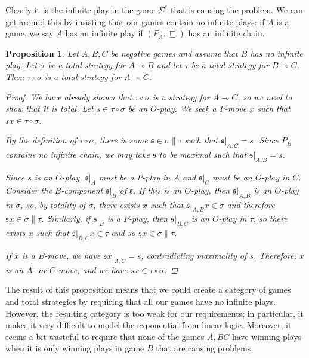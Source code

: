 \documentclass[11pt]{article} %
\theoremstyle{plain} %
\newtheorem{proposition}[theorem]{Proposition}
\theoremstyle{definition} %
\theoremstyle{note}
\theoremstyle{exercisestyle}
\renewcommand{\implies}{\multimap}
\newcommand{\comp}[2]{#1 \circ #2}
\newcommand{\s}{\mathfrak s}
\newcommand{\prefix}{\sqsubseteq}
\newcommand{\st}{{\Sigma^*}}
\begin{document}
Clearly it is the infinite play in the game $\st$ that is causing the problem.  We can get around this by insisting that our games contain no infinite plays: if $A$ is a game, we say $A$ has an infinite play if $(P_A,\prefix)$ has an infinite chain.

\begin{proposition}
  \label{BoundedTotalComposition}
  Let $A,B,C$ be negative games and assume that $B$ has no infinite play.  Let $\sigma$ be a total strategy for $A\implies B$ and let $\tau$ be a total strategy for $B\implies C$.  Then $\comp\tau\sigma$ is a total strategy for $A\implies C$.
  \begin{proof}
    We have already shown that $\comp\tau\sigma$ is a strategy for $A\implies C$, so we need to show that it is total.  Let $s\in\comp\tau\sigma$ be an $O$-play.  We seek a $P$-move $x$ such that $sx\in\comp\tau\sigma$.  

    By the definition of $\comp\tau\sigma$, there is some $\s\in\sigma\|\tau$ such that $\s\vert_{A,C}=s$.  Since $P_B$ contains no infinite chain, we may take $\s$ to be maximal such that $\s\vert_{A,B}=s$.  
    
    Since $s$ is an $O$-play, $\s\vert_A$ must be a $P$-play in $A$ and $\s\vert_C$ must be an $O$-play in $C$.  Consider the $B$-component $\s\vert_B$ of $\s$.  If this is an $O$-play, then $\s\vert_{A,B}$ is an $O$-play in $\sigma$, so, by totality of $\sigma$, there exists $x$ such that $\s\vert_{A,B}x\in\sigma$ and therefore $\s x\in\sigma\|\tau$.  Similarly, if $\s\vert_B$ is a $P$-play, then $\s\vert_{B,C}$ is an $O$-play in $\tau$, so there exists $x$ such that $\s\vert_{B,C}x\in\tau$ and so $\s x\in\sigma\|\tau$.  

    If $x$ is a $B$-move, we have $\s x\vert_{A,C}=s$, contradicting maximality of $s$.  Therefore, $x$ is an $A$- or $C$-move, and we have $sx\in\comp\tau\sigma$.
  \end{proof}
\end{proposition}

The result of this proposition means that we could create a category of games and total strategies by requiring that all our games have no infinite plays.  However, the resulting category is too weak for our requirements; in particular, it makes it very difficult to model the exponential from linear logic.  Moreover, it seems a bit wasteful to require that none of the games $A,BC$ have winning plays when it is only winning plays in game $B$ that are causing problems.  
\end{document}
